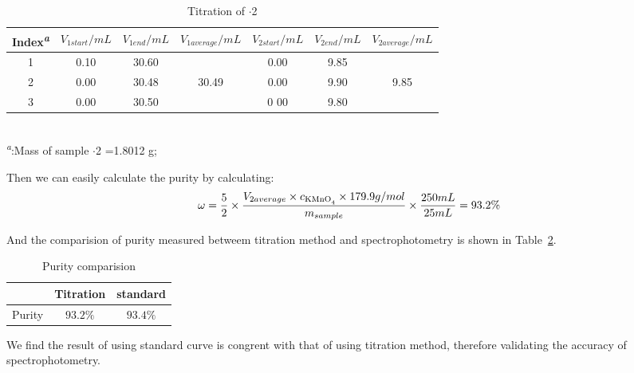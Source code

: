 \begin{table}[H]
    \caption{Titration of $\cdot$2}
    \label{tab.Tit}
    \begin{tabular}{ccccccc}
    \toprule
    Index\textsuperscript{\emph{a}}&$V_{1start}/mL$&$V_{1end}/mL$&$V_{1average}/mL$&$V_{2start}/mL$& $V_{2end}/mL$&$V_{2average}/mL$\\
    \midrule
    1    & 0.10 & 30.60 &       & 0.00 & 9.85 &     \\
    2    & 0.00 & 30.48 & 30.49 & 0.00 & 9.90 & 9.85\\
    3    & 0.00 & 30.50 &       & 0 00 & 9.80 &     \\
    \bottomrule
    \end{tabular}\\
    \textsuperscript{\emph{a}}:Mass of sample $\cdot$2 =1.8012 g;
\end{table}

Then we can easily calculate the purity by calculating: \[\omega=\frac{5}{2}\times\frac{V_{2average}\times c_{\ce{KMnO4}}\times179.9 g/mol}{m_{sample}}\times\frac{250mL}{25mL}=93.2\%\]

And the comparision of purity measured betweem titration method and spectrophotometry is shown in Table~\ref{tab.Res}.

\begin{table}[H]
    \caption{Purity comparision}
    \label{tab.Res}
    \begin{tabular}{ccc}
    \toprule
           & Titration & standard\\
    \midrule
    Purity & $93.2\%$  & $93.4\%$   \\
    \bottomrule
    \end{tabular}
\end{table}

We find the result of using standard curve is congrent with that of using titration method, therefore validating the accuracy of spectrophotometry.